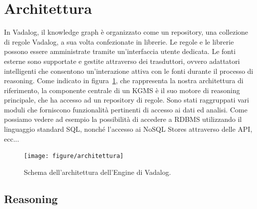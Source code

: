 \section{Architettura}

In Vadalog, il knowledge graph è organizzato come un repository, una collezione di regole Vadalog, a sua volta confezionate in librerie. \newline
Le regole e le librerie possono essere amministrate tramite un'interfaccia utente dedicata. \newline
Le fonti esterne sono supportate e gestite attraverso dei trasduttori, ovvero adattatori intelligenti che consentono un'interazione attiva con le fonti durante il processo di reasoning. \newline
Come indicato in figura~\ref{fig:architettura}, che rappresenta la nostra architettura di riferimento, la componente centrale di un KGMS è il suo motore di reasoning principale, che ha accesso ad un repository di regole. Sono stati raggruppati vari moduli che forniscono funzionalità pertinenti di accesso ai dati ed analisi. Come possiamo vedere ad esempio la possibilità di accedere a RDBMS utilizzando il linguaggio standard SQL, nonché l'accesso ai NoSQL Stores attraverso delle API, ecc...  \newpage \clearpage

\begin{figure}[h!]
	\centering
	\texttt{[image: figure/architettura]}
	\caption{Schema dell'architettura dell'Engine di Vadalog.}
	\label{fig:architettura}
\end{figure}

\subsection{Reasoning}

